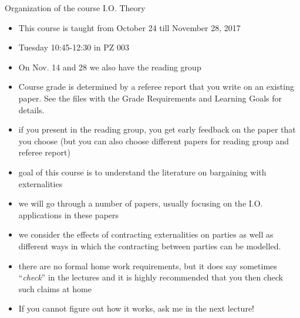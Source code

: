\documentclass[11pt,english]{beamer}
\begin{document}
\begin{frame}[allowframebreaks]{Organization of the course I.O. Theory}
  \begin{itemize}
  \item This course is taught from October 24 till November 28, 2017
  \item Tuesday 10:45-12:30 in PZ 003
  \item On Nov. 14 and 28 we also have the reading group
  \item Course grade is determined by a referee report that you write
    on an existing paper. See the files with the Grade Requirements
    and Learning Goals for details.
  \item if you present in the reading group, you get early feedback on the paper
    that you choose (but you can also choose different papers for reading group and referee report)
  \item goal of this course is to understand the literature on
    bargaining with externalities
  \item we will go through a number of papers, usually focusing on the
    I.O. applications in these papers
  \item we consider the effects of contracting externalities on
    parties as well as different ways in which the contracting between
    parties can be modelled.
  \item there are no formal home work requirements, but it does say
    sometimes ``\emph{check}'' in the lectures and it is highly recommended
    that you then check such claims at home
  \item If you cannot figure out how it works, ask me in the next
    lecture!
  \end{itemize}
\end{frame}
\end{document}
